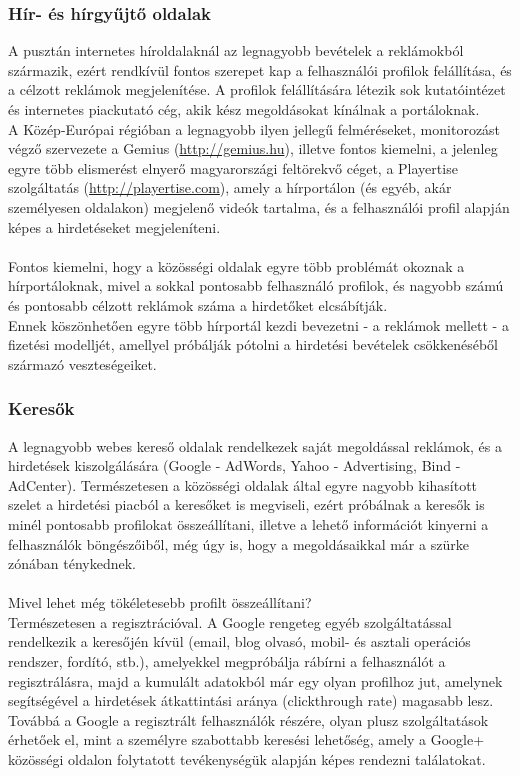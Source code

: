 \subsubsection{Hír- és hírgyűjtő oldalak} %
\label{ssub:hír_és_hírgyűjtő_oldalak}
A pusztán internetes híroldalaknál az legnagyobb bevételek a reklámokból származik, ezért rendkívül fontos szerepet kap a felhasználói profilok felállítása, és a célzott reklámok megjelenítése. A profilok felállítására létezik sok kutatóintézet és internetes piackutató cég, akik kész megoldásokat kínálnak a portáloknak.\hfill\\
A Közép-Európai régióban a legnagyobb ilyen jellegű felméréseket, monitorozást végző szervezete a Gemius (\url{http://gemius.hu}), illetve fontos kiemelni, a jelenleg egyre több elismerést elnyerő magyarországi feltörekvő céget, a Playertise szolgáltatás (\url{http://playertise.com}), amely a hírportálon (és egyéb, akár személyesen oldalakon) megjelenő videók tartalma, és a felhasználói profil alapján képes a hirdetéseket megjeleníteni.\hfill\\
\\
Fontos kiemelni, hogy a közösségi oldalak egyre több problémát okoznak a hírportáloknak, mivel a sokkal pontosabb felhasználó profilok, és nagyobb számú és pontosabb célzott reklámok száma a hirdetőket elcsábítják. \cite{newspaper_ad_revenue}\hfill\\
Ennek köszönhetően egyre több hírportál kezdi bevezetni - a reklámok mellett - a fizetési modelljét, amellyel próbálják pótolni a hirdetési bevételek csökkenéséből származó veszteségeiket. \cite{newspapers_go_to_paying_model}

\subsubsection{Keresők} %
\label{ssub:keresők}
A legnagyobb webes kereső oldalak rendelkezek saját megoldással reklámok, és a hirdetések kiszolgálására (Google - AdWords, Yahoo - Advertising, Bind - AdCenter). Természetesen a közösségi oldalak által egyre nagyobb kihasított szelet a hirdetési piacból a keresőket is megviseli, ezért próbálnak a keresők is minél pontosabb profilokat összeállítani, illetve a lehető információt kinyerni a felhasználók böngészőiből, még úgy is, hogy a megoldásaikkal már a szürke zónában ténykednek. \cite{google_on_safari}\hfill\\
\\
Mivel lehet még tökéletesebb profilt összeállítani?
\\
Természetesen a regisztrációval. A Google rengeteg egyéb szolgáltatással rendelkezik a keresőjén kívül (email, blog olvasó, mobil- és asztali operációs rendszer, fordító, stb.), amelyekkel megpróbálja rábírni a felhasználót a regisztrálásra, majd a kumulált adatokból már egy olyan profilhoz jut, amelynek segítségével a hirdetések átkattintási aránya (clickthrough rate) magasabb lesz. Továbbá a Google a regisztrált felhasználók részére, olyan plusz szolgáltatások érhetőek el, mint a személyre szabottabb keresési lehetőség, amely a Google+ közösségi oldalon folytatott tevékenységük alapján képes rendezni találatokat. \cite{gplus_personal}

